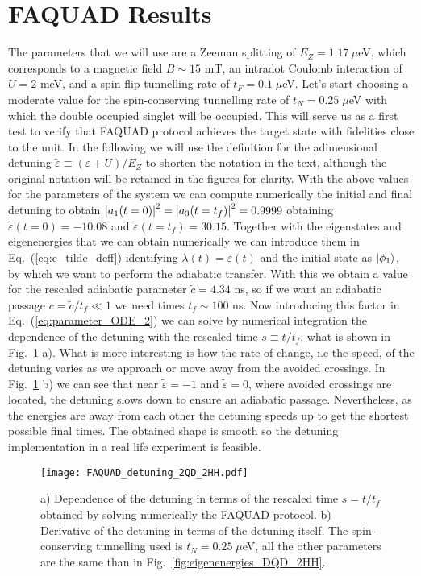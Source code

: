\section{FAQUAD Results}
The parameters that we will use are a Zeeman splitting of $E_Z=1.17\: \mu$eV, which corresponds to a magnetic field $B\sim 15$ mT, an intradot Coulomb interaction of $U= 2$ meV, and a spin-flip tunnelling rate of $t_F=0.1\; \mu$eV. Let's start choosing a moderate value for the spin-conserving tunnelling rate of $t_N=0.25\; \mu$eV with which the double occupied singlet will be occupied. This will serve us as a first test to verify that FAQUAD protocol achieves the target state with fidelities close to the unit. In the following we will use the definition for the adimensional detuning $\tilde{\varepsilon}\equiv (\varepsilon+U)/E_Z$ to shorten the notation in the text, although the original notation will be retained in the figures for clarity. With the above values for the parameters of the system we can compute numerically the initial and final detuning to obtain $\abs{a_1(t=0)}^2=\abs{a_3(t=t_f)}^2=0.9999$ obtaining $\tilde{\varepsilon}(t=0)=-10.08$ and $\tilde{\varepsilon}(t=t_f)=30.15$. Together with the eigenstates and eigenenergies that we can obtain numerically we can introduce them in Eq.~(\ref{eq:c_tilde_deff}) identifying $\lambda(t)=\varepsilon(t)$ and the initial state as $\ket{\phi_1}$, by which we want to perform the adiabatic transfer. With this we obtain a value for the rescaled adiabatic parameter $\tilde{c}=4.34$ ns, so if we want an adiabatic passage $c=\tilde{c}/t_f\ll 1$ we need times $t_f\sim 100$ ns. Now introducing this factor in Eq.~(\ref{eq:parameter_ODE_2}) we can solve by numerical integration the dependence of the detuning with the rescaled time $s\equiv t/t_f$, what is shown in Fig.~\ref{fig:FAQUAD_detuning_2QD_2HH} a). What is more interesting is how the rate of change, i.e the speed, of the detuning varies as we approach or move away from the avoided crossings. In Fig.~\ref{fig:FAQUAD_detuning_2QD_2HH} b) we can see that near $\tilde{\varepsilon}=-1$ and $\tilde{\varepsilon}=0$, where avoided crossings are located, the detuning slows down to ensure an adiabatic passage. Nevertheless, as the energies are away from each other the detuning speeds up to get the shortest possible final times. The obtained shape is smooth so the detuning implementation in a real life experiment is feasible.
\begin{figure}[!htbp]
	\centering
	\texttt{[image: FAQUAD\_detuning\_2QD\_2HH.pdf]}
	\caption{a) Dependence of the detuning in terms of the rescaled time $s=t/t_f$ obtained by solving numerically the FAQUAD protocol. b) Derivative of the detuning in terms of the detuning itself. The spin-conserving tunnelling used is $t_N=0.25\; \mu$eV, all the other parameters are the same than in Fig.~\ref{fig:eigenenergies_DQD_2HH}.}
	\label{fig:FAQUAD_detuning_2QD_2HH}
\end{figure}

